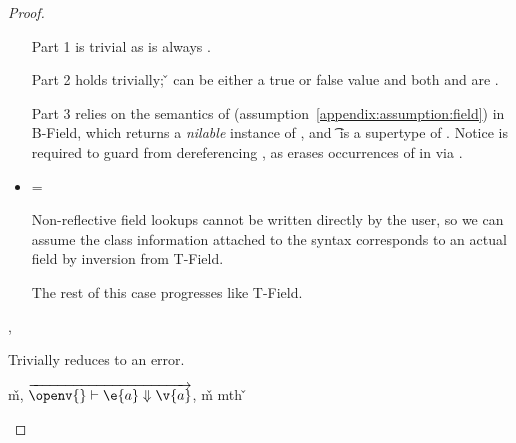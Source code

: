 \begin{lemma}
\begin{proof}
\begin{case}[B-Field]
\begin{itemize}
\begin{subcase}[T-Field]
Part 1 is trivial as \object{} is always \emptyobject{}.

Part 2 holds trivially; \v{} can be either a true or false value
and both {\thenprop{\prop{}}} and {\elseprop{\prop{}}}
are \topprop{}.

Part 3 relies on the semantics of \getfieldliteral (assumption~\ref{appendix:assumption:field})
in B-Field, which returns a \emph{nilable} instance of ,
and \t{} is a supertype of .
Notice \issubtypein{}{\s{}}{\Object{}} is required to guard from dereferencing \nil{},
as {} erases occurrences of \Nil{} in \s{} via  .
\end{subcase}
  \item[]

\begin{subcase}[T-FieldStatic]
  {\ep{}} = { {} {\fld{}} {}}

  Non-reflective field lookups cannot be written directly by the user, so we can assume
  the class information attached to the syntax corresponds to an actual field by inversion
  from T-Field.

  The rest of this case progresses like T-Field.
\end{subcase}

\end{itemize}
\end{case}

\begin{case}[BE-Field]
  \opsem {\openv{}}
         {} 
         {\errorvalv{}},
  \opsem {\openv{}}
         {\e{}}
         {\errorvalv{}}

         Trivially reduces to an error.

\end{case}

\begin{case}[B-Method]
  \opsem {\openv{}}
         {}
         {\v{m}},
  $\overrightarrow{
  \opsem {\openv{}}
         {\e{a}}
         {\v{a}}}$,
   {\v{m}} {mth}
                    {} {}
                    {}
                    {\v{}}


\end{case}
\end{proof}
\end{lemma}
